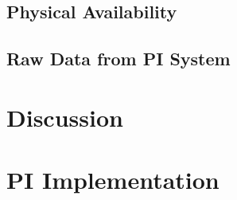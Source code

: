 \documentclass[11pt,a4paper,twoside,onecolumn]{book}
\begin{document}
		\section{Physical Availability}
		
		\section{Raw Data from PI System}
		
	\chapter{Discussion}
	
	\chapter{PI Implementation}
	
\end{document}
